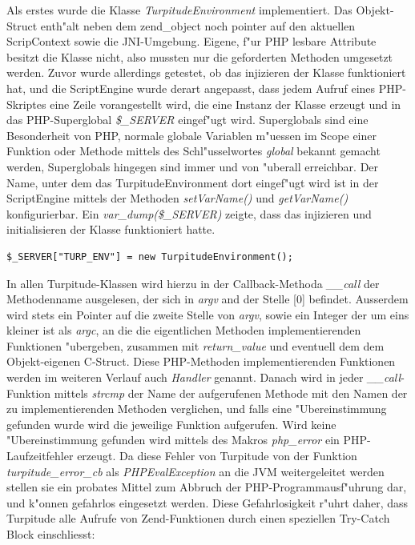 Als erstes wurde die Klasse \emph{TurpitudeEnvironment} implementiert. Das Objekt-Struct enth"alt neben dem zend\_object noch pointer
auf den aktuellen ScripContext sowie die JNI-Umgebung. Eigene, f"ur PHP lesbare Attribute besitzt die Klasse nicht, also mussten
nur die geforderten Methoden umgesetzt werden. Zuvor wurde allerdings getestet, ob das injizieren der Klasse funktioniert hat, und die
ScriptEngine wurde derart angepasst, dass jedem Aufruf eines PHP-Skriptes eine Zeile vorangestellt wird, die eine Instanz der Klasse
erzeugt und in das PHP-Superglobal \emph{\$\_SERVER} eingef"ugt wird. Superglobals sind eine Besonderheit von PHP, normale globale
Variablen m"uessen im Scope einer Funktion oder Methode mittels des Schl"usselwortes \emph{global} bekannt gemacht werden, Superglobals
hingegen sind immer und von "uberall erreichbar. Der Name, unter dem das TurpitudeEnvironment dort eingef"ugt wird ist in der ScriptEngine
mittels der Methoden \emph{setVarName()} und \emph{getVarName()} konfigurierbar. Ein \emph{var\_dump(\$\_SERVER)} zeigte, dass das
injizieren und initialisieren der Klasse funktioniert hatte.
\begin{lstlisting}[caption=TurpitudeEnvironment in \$\_SERVER einf"ugen]
$_SERVER["TURP_ENV"] = new TurpitudeEnvironment();
\end{lstlisting}
In allen Turpitude-Klassen wird hierzu in der Callback-Methoda \emph{\_\_call} der 
Methodenname ausgelesen, der sich in \emph{argv} and der Stelle [0] befindet. Ausserdem wird stets ein Pointer auf die zweite Stelle
von \emph{argv}, sowie ein Integer der um eins kleiner ist als \emph{argc}, an die die eigentlichen
Methoden implementierenden Funktionen "ubergeben, zusammen mit \emph{return\_value} und eventuell dem dem Objekt-eigenen C-Struct.
Diese PHP-Methoden implementierenden Funktionen werden im weiteren Verlauf auch \emph{Handler} genannt.
Danach wird in jeder \emph{\_\_call}-Funktion mittels \emph{strcmp} der Name der aufgerufenen Methode mit den Namen der zu implementierenden 
Methoden verglichen, und falls eine "Ubereinstimmung gefunden wurde wird die jeweilige Funktion aufgerufen. Wird keine "Ubereinstimmung
gefunden wird mittels des Makros \emph{php\_error} ein PHP-Laufzeitfehler erzeugt. Da diese Fehler von Turpitude von der Funktion
\emph{turpitude\_error\_cb} als \emph{PHPEvalException} an die JVM weitergeleitet werden stellen sie ein probates Mittel zum Abbruch
der PHP-Programmausf"uhrung dar, und k"onnen gefahrlos eingesetzt werden. 
Diese Gefahrlosigkeit r"uhrt daher, dass Turpitude alle Aufrufe von Zend-Funktionen durch einen speziellen Try-Catch Block einschliesst:
